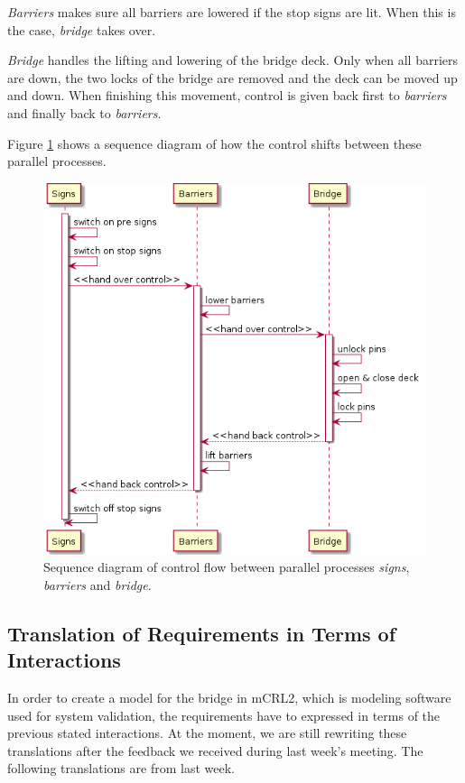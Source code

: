 \documentclass{article}
\begin{document}
\emph{Barriers} makes sure all barriers are lowered if the stop signs are lit. When this is the case, \emph{bridge} takes over.

\emph{Bridge} handles the lifting and lowering of the bridge deck. Only when all barriers are down, the two locks of the bridge are removed and the deck can be moved up and down. When finishing this movement, control is given back first to \emph{barriers} and finally back to \emph{barriers}.

Figure \ref{fig:arch} shows a sequence diagram of how the control shifts between these parallel processes.
%
\begin{figure}%
\centering
\includegraphics[width=0.5\columnwidth]{Architecture}%
\caption{Sequence diagram of control flow between parallel processes \emph{signs}, \emph{barriers} and \emph{bridge}.}%
\label{fig:arch}%
\end{figure}

\subsection{Translation of Requirements in Terms of Interactions}

In order to create a model for the bridge in mCRL2, which is modeling software used for system validation, the requirements have to expressed in terms of the previous stated interactions. At the moment, we are still rewriting these translations after the feedback we received during last week's meeting. The following translations are from last week.
\end{document}
